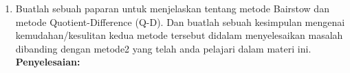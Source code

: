 \documentclass{article}
\newcommand{\penyelesaian}{\textbf{Penyelesaian: }}
\begin{document}
\begin{enumerate}
    \item Buatlah sebuah paparan untuk menjelaskan tentang metode Bairstow dan metode Quotient-Difference (Q-D). 
    Dan buatlah sebuah kesimpulan mengenai kemudahan/kesulitan kedua metode tersebut didalam menyelesaikan masalah dibanding dengan metode2 yang telah anda pelajari dalam materi ini. \\
    \penyelesaian
\end{enumerate}
\end{document}
